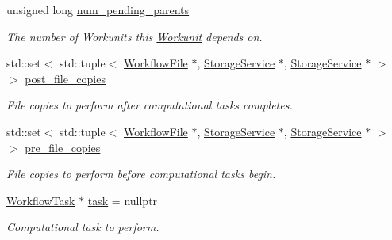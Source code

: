 \begin{DoxyCompactItemize}
\mbox{\label{classwrench_1_1_workunit_aebb7c84be20b163a11dc0ecf4d4aa4f6}} 
unsigned long \hyperlink{classwrench_1_1_workunit_aebb7c84be20b163a11dc0ecf4d4aa4f6}{num\+\_\+pending\+\_\+parents}
\begin{DoxyCompactList}\small\item\em The number of Workunits this \hyperlink{classwrench_1_1_workunit}{Workunit} depends on. \end{DoxyCompactList}\item 
\mbox{\label{classwrench_1_1_workunit_a0bd150508109344de5da6284f591a83d}} 
std\+::set$<$ std\+::tuple$<$ \hyperlink{classwrench_1_1_workflow_file}{Workflow\+File} $\ast$, \hyperlink{classwrench_1_1_storage_service}{Storage\+Service} $\ast$, \hyperlink{classwrench_1_1_storage_service}{Storage\+Service} $\ast$ $>$ $>$ \hyperlink{classwrench_1_1_workunit_a0bd150508109344de5da6284f591a83d}{post\+\_\+file\+\_\+copies}
\begin{DoxyCompactList}\small\item\em File copies to perform after computational tasks completes. \end{DoxyCompactList}\item 
\mbox{\label{classwrench_1_1_workunit_a6010b01e695180b8b38cc8cf2670a19c}} 
std\+::set$<$ std\+::tuple$<$ \hyperlink{classwrench_1_1_workflow_file}{Workflow\+File} $\ast$, \hyperlink{classwrench_1_1_storage_service}{Storage\+Service} $\ast$, \hyperlink{classwrench_1_1_storage_service}{Storage\+Service} $\ast$ $>$ $>$ \hyperlink{classwrench_1_1_workunit_a6010b01e695180b8b38cc8cf2670a19c}{pre\+\_\+file\+\_\+copies}
\begin{DoxyCompactList}\small\item\em File copies to perform before computational tasks begin. \end{DoxyCompactList}\item 
\mbox{\label{classwrench_1_1_workunit_a7639e2dcd02bff9f64682279305a7f6a}} 
\hyperlink{classwrench_1_1_workflow_task}{Workflow\+Task} $\ast$ \hyperlink{classwrench_1_1_workunit_a7639e2dcd02bff9f64682279305a7f6a}{task} = nullptr
\begin{DoxyCompactList}\small\item\em Computational task to perform. \end{DoxyCompactList}\end{DoxyCompactItemize}


